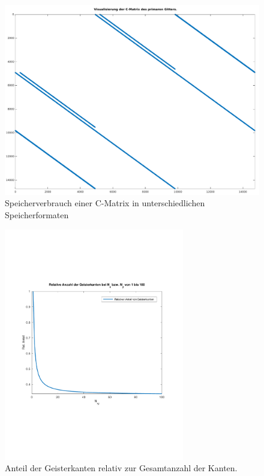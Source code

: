\documentclass[Protokollheft.tex]{subfiles}
\begin{document}
\begin{figure}[h!]
	\centering
	\includegraphics[width=0.7\linewidth]{VisuCMatrixPrimGitt}
	\caption{Speicherverbrauch einer C-Matrix in unterschiedlichen Speicherformaten}
	\label{fig:visucmatrixprimgitt}
\end{figure}
\begin{figure}[h]
	\centering
	\includegraphics[trim = 15mm 65mm 15mm 60mm, clip, width=0.7\textwidth]{plotBoundEdg.pdf}
	\caption{Anteil der Geisterkanten relativ zur Gesamtanzahl der Kanten.}
	\label{Abb:boundEdg}
\end{figure}
\end{document}
